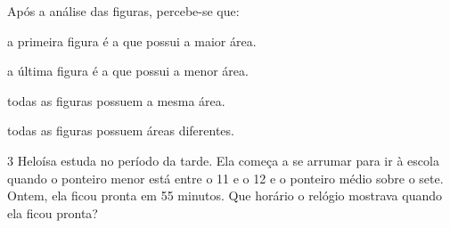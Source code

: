 Após a análise das figuras, percebe-se que:

\begin{escolha}
\item
  a primeira figura é a que possui a maior área.
\item
  a última figura é a que possui a menor área.
\item
  todas as figuras possuem a mesma área.
\item
  todas as figuras possuem áreas diferentes.
\end{escolha}

\num{3} Heloísa estuda no período da tarde. Ela começa a se arrumar para ir à escola 
quando o ponteiro menor está entre o 11 e o 12 e o ponteiro médio sobre o sete. Ontem,
ela ficou pronta em 55 minutos. Que horário o relógio mostrava quando ela ficou pronta?

